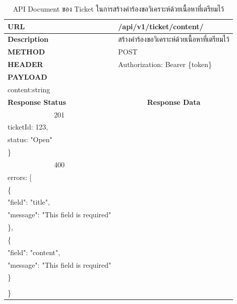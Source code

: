 \documentclass[12pt,oneside,openright,a4paper]{cpe-thai-project}
\begin{document}
\begin{longtable}[!ht]{p{3cm}|p{8cm}}
  \caption{API Document ของ Ticket ในการสร้างคำร้องขอวิเคราะห์ด้วยเนื้อหาที่เตรียมไว้ }\label{tbl:api_ticket_content} 
    \endfirsthead
    \endhead
    \hhline{==}
    \textbf{URL}              & /api/v1/ticket/content/                                                                                              \\ \hline
    \textbf{Description}      & สร้างคำร้องขอวิเคราะห์ด้วยเนื้อหาที่เตรียมไว้                                                                                      \\ \hline
    \textbf{METHOD}           & POST                                                                                                                 \\ \hline
    \textbf{HEADER}           & Authorization: Bearer \{token\}                                                                                         \\ \hline
    \textbf{PAYLOAD}          & \begin{tabular}[c]{@{}l@{}}title:\quad\quad string \\ content:\quad string\end{tabular}  \\ \hline \newpage \hline
    \textbf{Response Status}  & \multicolumn{1}{c}{\textbf{Response Data}}                                                                          \\ \hline
    \multicolumn{1}{c|}{201}  & \begin{tabular}[c]{@{}l@{}}\{\\ \quad ticketId: 123,\\ \quad status: "Open"\\ \}\end{tabular}                                 \\ \hline
    \multicolumn{1}{c|}{400}  &
    \begin{tabular}[c]{@{}l@{}}\{\\ \quad errors: {[}\\ \quad\quad\{\\ \quad\quad\quad "field": "title",\\ \quad\quad\quad"message": "This field is required"\\ \quad\quad\},\\ 
      \quad\quad\{\\ \quad\quad\quad"field": "content",\\ \quad\quad\quad "message": "This field is required"\\ \quad\quad \}\\\quad {]}\\ \}\end{tabular}  \\ \hline

\end{longtable}
\end{document}
